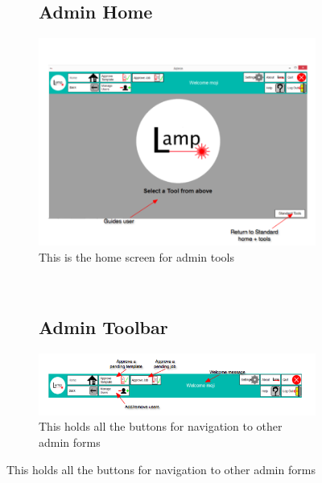 \documentclass[oneside,openany,11pt,a4paper]{report}
\begin{document}
\begin{figure}[H]
	\begin{subfigure}[t]{0.5\textwidth}
	\subsection{Admin Home}
		\centering
		\includegraphics[width=\textwidth]{screen/adminhome.png}
		\caption{This is the home screen for admin tools}

		
	\end{subfigure}
	~
	\begin{subfigure}[t]{0.5\textwidth}
	\subsection{Admin Toolbar}

		\centering
		\includegraphics[width=\textwidth]{screen/admintoolbar.png}
		\caption{This holds all the buttons for navigation to other admin forms}

	\end{subfigure}
\end{figure}
\end{document}
